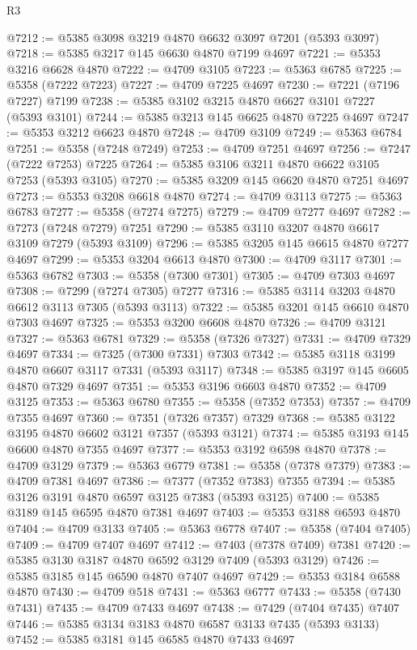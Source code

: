 \begin{lexlean}{R3}
\begin{coremodule}
@7212 := @5385 @3098 @3219 @4870 @6632 @3097 @7201 (@5393 @3097)
@7218 := @5385 @3217 @145 @6630 @4870 @7199 @4697
@7221 := @5353 @3216 @6628 @4870
@7222 := @4709 @3105
@7223 := @5363 @6785
@7225 := @5358 (@7222 @7223)
@7227 := @4709 @7225 @4697
@7230 := @7221 (@7196 @7227) @7199
@7238 := @5385 @3102 @3215 @4870 @6627 @3101 @7227 (@5393 @3101)
@7244 := @5385 @3213 @145 @6625 @4870 @7225 @4697
@7247 := @5353 @3212 @6623 @4870
@7248 := @4709 @3109
@7249 := @5363 @6784
@7251 := @5358 (@7248 @7249)
@7253 := @4709 @7251 @4697
@7256 := @7247 (@7222 @7253) @7225
@7264 := @5385 @3106 @3211 @4870 @6622 @3105 @7253 (@5393 @3105)
@7270 := @5385 @3209 @145 @6620 @4870 @7251 @4697
@7273 := @5353 @3208 @6618 @4870
@7274 := @4709 @3113
@7275 := @5363 @6783
@7277 := @5358 (@7274 @7275)
@7279 := @4709 @7277 @4697
@7282 := @7273 (@7248 @7279) @7251
@7290 := @5385 @3110 @3207 @4870 @6617 @3109 @7279 (@5393 @3109)
@7296 := @5385 @3205 @145 @6615 @4870 @7277 @4697
@7299 := @5353 @3204 @6613 @4870
@7300 := @4709 @3117
@7301 := @5363 @6782
@7303 := @5358 (@7300 @7301)
@7305 := @4709 @7303 @4697
@7308 := @7299 (@7274 @7305) @7277
@7316 := @5385 @3114 @3203 @4870 @6612 @3113 @7305 (@5393 @3113)
@7322 := @5385 @3201 @145 @6610 @4870 @7303 @4697
@7325 := @5353 @3200 @6608 @4870
@7326 := @4709 @3121
@7327 := @5363 @6781
@7329 := @5358 (@7326 @7327)
@7331 := @4709 @7329 @4697
@7334 := @7325 (@7300 @7331) @7303
@7342 := @5385 @3118 @3199 @4870 @6607 @3117 @7331 (@5393 @3117)
@7348 := @5385 @3197 @145 @6605 @4870 @7329 @4697
@7351 := @5353 @3196 @6603 @4870
@7352 := @4709 @3125
@7353 := @5363 @6780
@7355 := @5358 (@7352 @7353)
@7357 := @4709 @7355 @4697
@7360 := @7351 (@7326 @7357) @7329
@7368 := @5385 @3122 @3195 @4870 @6602 @3121 @7357 (@5393 @3121)
@7374 := @5385 @3193 @145 @6600 @4870 @7355 @4697
@7377 := @5353 @3192 @6598 @4870
@7378 := @4709 @3129
@7379 := @5363 @6779
@7381 := @5358 (@7378 @7379)
@7383 := @4709 @7381 @4697
@7386 := @7377 (@7352 @7383) @7355
@7394 := @5385 @3126 @3191 @4870 @6597 @3125 @7383 (@5393 @3125)
@7400 := @5385 @3189 @145 @6595 @4870 @7381 @4697
@7403 := @5353 @3188 @6593 @4870
@7404 := @4709 @3133
@7405 := @5363 @6778
@7407 := @5358 (@7404 @7405)
@7409 := @4709 @7407 @4697
@7412 := @7403 (@7378 @7409) @7381
@7420 := @5385 @3130 @3187 @4870 @6592 @3129 @7409 (@5393 @3129)
@7426 := @5385 @3185 @145 @6590 @4870 @7407 @4697
@7429 := @5353 @3184 @6588 @4870
@7430 := @4709 @518
@7431 := @5363 @6777
@7433 := @5358 (@7430 @7431)
@7435 := @4709 @7433 @4697
@7438 := @7429 (@7404 @7435) @7407
@7446 := @5385 @3134 @3183 @4870 @6587 @3133 @7435 (@5393 @3133)
@7452 := @5385 @3181 @145 @6585 @4870 @7433 @4697

\end{coremodule}
\end{lexlean}
